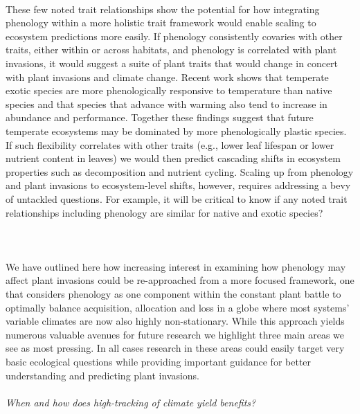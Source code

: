 \documentclass[11pt,a4paper,oneside]{article}
\begin{document}
\\
These few noted trait relationships show the potential for how integrating phenology within a more holistic trait framework would enable scaling to ecosystem predictions more easily. If phenology consistently covaries with other traits, either within or across habitats, and phenology is correlated with plant invasions, it would suggest a suite of plant traits that would change in concert with plant invasions and climate change. Recent work shows that temperate exotic species are more phenologically responsive to temperature than native species and that species that advance with warming also tend to increase in abundance and performance. Together these findings suggest that future temperate ecosystems may be dominated by more phenologically plastic species. If such flexibility correlates with other traits (e.g., lower leaf lifespan or lower nutrient content in leaves) we would then predict cascading shifts in ecosystem properties such as decomposition and nutrient cycling. Scaling up from phenology and plant invasions to ecosystem-level shifts, however, requires addressing a bevy of untackled questions. For example, it will be critical to know if any noted trait relationships including phenology are similar for native and exotic species? \\
\\
\\
\\
We have outlined here how increasing interest in examining how phenology may affect plant invasions could be re-approached from a more focused framework, one that considers phenology as one component within the constant plant battle to optimally balance acquisition, allocation and loss in a globe where most systems' variable climates are now also highly non-stationary. While this approach yields numerous valuable avenues for future research we highlight three main areas we see as most pressing. In all cases research in these areas could easily target very basic ecological questions while providing important guidance for better understanding and predicting plant invasions.\\
\\
\noindent \emph{When and how does high-tracking of climate yield benefits?}\\
\end{document}
